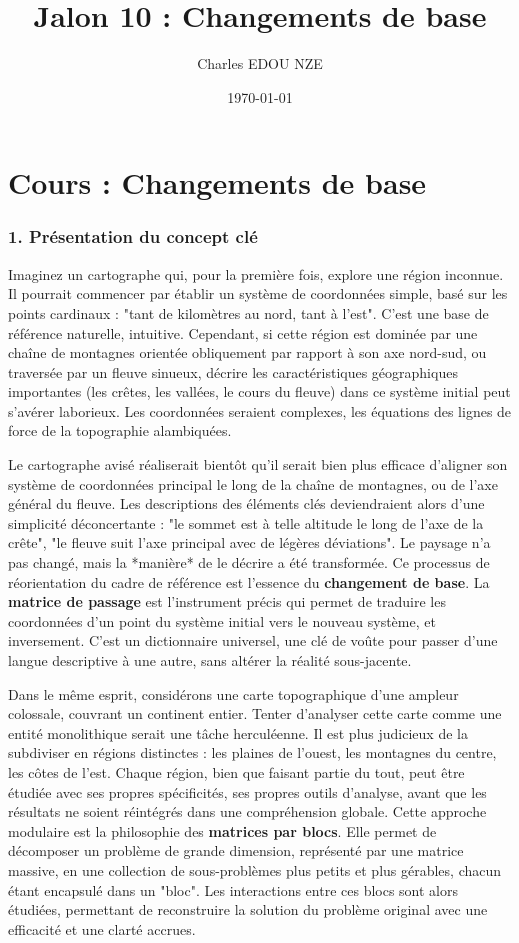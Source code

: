 \documentclass{report}
\title{Jalon 10 : Changements de base}
\author{Charles EDOU NZE}
\date{\today}
\begin{document}
\maketitle
\tableofcontents
\chapter{Cours : Changements de base}
\subsection*{1. Présentation du concept clé}

Imaginez un cartographe qui, pour la première fois, explore une région inconnue. Il pourrait commencer par établir un système de coordonnées simple, basé sur les points cardinaux : "tant de kilomètres au nord, tant à l'est". C'est une base de référence naturelle, intuitive. Cependant, si cette région est dominée par une chaîne de montagnes orientée obliquement par rapport à son axe nord-sud, ou traversée par un fleuve sinueux, décrire les caractéristiques géographiques importantes (les crêtes, les vallées, le cours du fleuve) dans ce système initial peut s'avérer laborieux. Les coordonnées seraient complexes, les équations des lignes de force de la topographie alambiquées.

Le cartographe avisé réaliserait bientôt qu'il serait bien plus efficace d'aligner son système de coordonnées principal le long de la chaîne de montagnes, ou de l'axe général du fleuve. Les descriptions des éléments clés deviendraient alors d'une simplicité déconcertante : "le sommet est à telle altitude le long de l'axe de la crête", "le fleuve suit l'axe principal avec de légères déviations". Le paysage n'a pas changé, mais la *manière* de le décrire a été transformée. Ce processus de réorientation du cadre de référence est l'essence du \textbf{changement de base}. La \textbf{matrice de passage} est l'instrument précis qui permet de traduire les coordonnées d'un point du système initial vers le nouveau système, et inversement. C'est un dictionnaire universel, une clé de voûte pour passer d'une langue descriptive à une autre, sans altérer la réalité sous-jacente.

Dans le même esprit, considérons une carte topographique d'une ampleur colossale, couvrant un continent entier. Tenter d'analyser cette carte comme une entité monolithique serait une tâche herculéenne. Il est plus judicieux de la subdiviser en régions distinctes : les plaines de l'ouest, les montagnes du centre, les côtes de l'est. Chaque région, bien que faisant partie du tout, peut être étudiée avec ses propres spécificités, ses propres outils d'analyse, avant que les résultats ne soient réintégrés dans une compréhension globale. Cette approche modulaire est la philosophie des \textbf{matrices par blocs}. Elle permet de décomposer un problème de grande dimension, représenté par une matrice massive, en une collection de sous-problèmes plus petits et plus gérables, chacun étant encapsulé dans un "bloc". Les interactions entre ces blocs sont alors étudiées, permettant de reconstruire la solution du problème original avec une efficacité et une clarté accrues.
\end{document}
